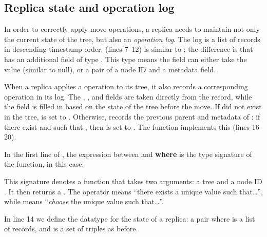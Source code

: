 \documentclass[sigplan,anonymous]{acmart}
\begin{document}
\subsection{Replica state and operation log}\label{sec:state-log}

In order to correctly apply move operations, a replica needs to maintain not only the current state of the tree, but also an \emph{operation log}.
The log is a list of  records in descending timestamp order.
 (lines 7--12) is similar to ; the difference is that  has an additional field  of type .
This  type means the field can either take the value  (similar to null), or a pair of a node ID and a metadata field.

When a replica applies a  operation to its tree, it also records a corresponding  operation in its log.
The , ,  and  fields are taken directly from the  record, while the  field is filled in based on the state of the tree before the move.
If  did not exist in the tree,  is set to .
Otherwise,  records the previous parent and metadata of : if there exist  and  such that , then  is set to .
The  function implements this (lines 16--20).

In the first line of , the expression between \isa{::} and \textbf{where} is the type signature of the function, in this case:
\begin{quote}
\end{quote}
This signature denotes a function that takes two arguments: a tree  and a node ID .
It then returns a .
The operator  means ``there exists a unique value  such that\dots'', while  means ``\emph{choose} the unique value  such that\ldots''.

In line 14 we define the datatype for the state of a replica: a pair  where  is a list of  records, and  is a set of  triples as before.
\end{document}
